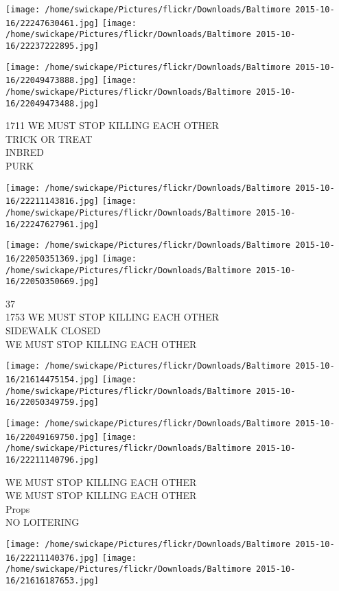\documentclass[10pt,letterpaper]{article}
\begin{document}
\texttt{[image: /home/swickape/Pictures/flickr/Downloads/Baltimore 2015-10-16/22247630461.jpg]}
\texttt{[image: /home/swickape/Pictures/flickr/Downloads/Baltimore 2015-10-16/22237222895.jpg]}

\texttt{[image: /home/swickape/Pictures/flickr/Downloads/Baltimore 2015-10-16/22049473888.jpg]}
\texttt{[image: /home/swickape/Pictures/flickr/Downloads/Baltimore 2015-10-16/22049473488.jpg]}

1711 WE MUST STOP KILLING EACH OTHER\\
TRICK OR TREAT\\
INBRED\\
PURK\\
\pagebreak

\texttt{[image: /home/swickape/Pictures/flickr/Downloads/Baltimore 2015-10-16/22211143816.jpg]}
\texttt{[image: /home/swickape/Pictures/flickr/Downloads/Baltimore 2015-10-16/22247627961.jpg]}

\texttt{[image: /home/swickape/Pictures/flickr/Downloads/Baltimore 2015-10-16/22050351369.jpg]}
\texttt{[image: /home/swickape/Pictures/flickr/Downloads/Baltimore 2015-10-16/22050350669.jpg]}

37\\
1753 WE MUST STOP KILLING EACH OTHER\\
SIDEWALK CLOSED\\
WE MUST STOP KILLING EACH OTHER\\
\pagebreak

\texttt{[image: /home/swickape/Pictures/flickr/Downloads/Baltimore 2015-10-16/21614475154.jpg]}
\texttt{[image: /home/swickape/Pictures/flickr/Downloads/Baltimore 2015-10-16/22050349759.jpg]}

\texttt{[image: /home/swickape/Pictures/flickr/Downloads/Baltimore 2015-10-16/22049169750.jpg]}
\texttt{[image: /home/swickape/Pictures/flickr/Downloads/Baltimore 2015-10-16/22211140796.jpg]}

WE MUST STOP KILLING EACH OTHER\\
WE MUST STOP KILLING EACH OTHER\\
Props\\
NO LOITERING\\
\pagebreak

\texttt{[image: /home/swickape/Pictures/flickr/Downloads/Baltimore 2015-10-16/22211140376.jpg]}
\texttt{[image: /home/swickape/Pictures/flickr/Downloads/Baltimore 2015-10-16/21616187653.jpg]}
\end{document}
